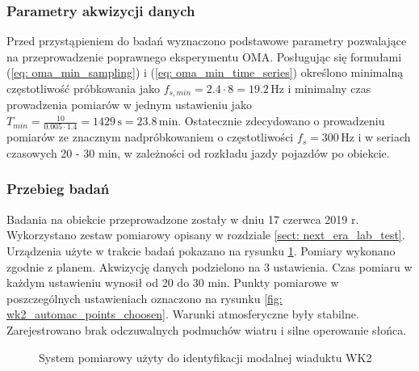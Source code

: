 \subsubsection{Parametry akwizycji danych}
Przed przystąpieniem do badań wyznaczono podstawowe parametry pozwalające na przeprowadzenie poprawnego eksperymentu OMA. Posługując się formułami (\ref{eq: oma_min_sampling}) i (\ref{eq: oma_min_time_series}) określono minimalną częstotliwość próbkowania jako $f_{s,min}=2.4\cdot8=19.2\,\text{Hz}$ i minimalny czas prowadzenia pomiarów w jednym ustawieniu jako $T_{min}=\frac{10}{0.005\cdot1.4}=1429\,\text{s}=23.8\,\text{min}$. Ostatecznie zdecydowano o prowadzeniu pomiarów ze znacznym nadpróbkowaniem o częstotliwości $f_s=300\,\text{Hz}$ i w seriach czasowych 20 - 30 min, w zależności od rozkładu jazdy pojazdów po obiekcie.


\subsubsection{Przebieg badań}
Badania na obiekcie przeprowadzone zostały w dniu 17 czerwca 2019 r. Wykorzystano zestaw pomiarowy opisany w rozdziale \ref{sect: next_era_lab_test}. Urządzenia użyte w trakcie badań pokazano na rysunku \ref{fig: wk2_foto_aparatura}. Pomiary wykonano zgodnie z planem. Akwizycję danych podzielono na 3 ustawienia. Czas pomiaru w każdym ustawieniu wynosił od 20 do 30 min. Punkty pomiarowe w poszczególnych ustawieniach oznaczono na rysunku \ref{fig: wk2_automac_points_choosen}. Warunki atmosferyczne były stabilne. Zarejestrowano brak odczuwalnych podmuchów wiatru i silne operowanie słońca.

\begin{figure}[hbt!]
	\centering
	 \quad 
	\captionsetup{justification=centering}
	\caption{System pomiarowy użyty do identyfikacji modalnej wiaduktu WK2}
	\label{fig: wk2_foto_aparatura}
\end{figure}


